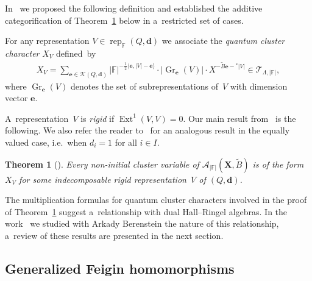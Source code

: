 \documentclass[pdftex]{sigma}
\numberwithin{equation}{section}
\newtheorem{Theorem}{Theorem}[section]
\begin{document}
In~\cite{rupel1} we proposed the following def\/inition and established the additive categorif\/ication of
Theorem~\ref{th:qcc} below in a~restricted set of cases.
\begin{Definition}
For any representation $V\in\operatorname{rep}_\mathbb{F}(Q,\mathbf{d})$ we associate the \emph{quantum cluster
character} $X_V$ def\/ined~by
\begin{gather*}
X_V=\sum\limits_{\mathbf{e}\in\mathcal{K}(Q,\mathbf{d})}|\mathbb{F}|^{-\frac{1}{2}\langle\mathbf{e},|V|-\mathbf{e}\rangle}
\cdot|\operatorname{Gr}_\mathbf{e}(V)|\cdot X^{-\widetilde B\mathbf{e}-{}^*|V|}\in\mathcal{T}_{\Lambda,|\mathbb{F}|},
\end{gather*}
where $\operatorname{Gr}_\mathbf{e}(V)$ denotes the set of subrepresentations of~$V$ with dimension vector $\mathbf{e}$.
\end{Definition}
A~representation~$V$ is \emph{rigid} if $\operatorname{Ext}^1(V,V)=0$.
Our main result from~\cite{rupel2} is the following.
We also refer the reader to~\cite{qin} for an analogous result in the equally valued case, i.e.~when $d_i=1$ for all
$i\in I$.
\begin{Theorem}[]
\label{th:qcc}
Every non-initial cluster variable of $\mathcal{A}_{|\mathbb{F}|}(\mathbf{X},\widetilde B)$ is of the
form $X_V$ for some indecomposable rigid representation~$V$ of $(Q,\mathbf{d})$.
\end{Theorem}

The multiplication formulas for quantum cluster characters involved in the proof of Theorem~\ref{th:qcc} suggest
a~relationship with dual Hall--Ringel algebras.
In the work~\cite{berenstein-rupel} we studied with Arkady Berenstein the nature of this relationship, a~review of these
results are presented in the next section.

\subsection{Generalized Feigin homomorphisms}
\label{subsec:hall_gen_feigin}
\end{document}
